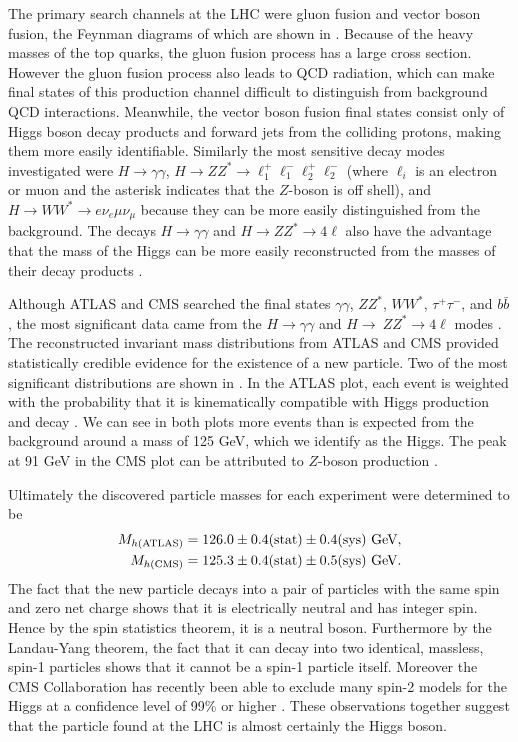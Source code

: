 The primary search channels at the LHC were gluon fusion and vector boson
fusion, the Feynman diagrams of which are shown in . 
Because of the 
heavy masses of the top quarks, the gluon fusion process has a large cross 
section. However the gluon fusion process also leads to QCD radiation, which 
can make final states of this production channel difficult to distinguish from 
background QCD interactions. Meanwhile, the vector boson fusion final states 
consist only of Higgs boson decay products and forward jets from the colliding 
protons, making them more easily identifiable. Similarly the most
sensitive decay modes investigated were $H\to\gamma\gamma$, $H\to ZZ^{*}\to
\ell_{1}^{+}\ell_{1}^{-}\ell_{2}^{+}\ell_{2}^{-}$ (where $\ell_i$ is an 
electron or muon and the asterisk indicates that the $Z$-boson is off 
shell), and
$H\to WW^{*}\to e\nu_{e}\mu\nu_{\mu}$ because they can be more easily
distinguished from the background. The decays $H\to\gamma\gamma$ 
and $H\to ZZ^{*}\to4\ell$ also have the advantage that the mass of the Higgs 
can be more easily reconstructed from the masses of their decay products
\cite{dittmaier_higgs_2013}.

Although ATLAS and CMS searched the final states $\gamma\gamma$, $ZZ^{*}$,
$WW^{*}$, $\tau^{+}\tau^{-}$, and $b\bar{b}$, the most significant data came
from the $H\to \gamma\gamma$ and $H\to\ ZZ^{*}\to4\ell$ modes \cite{thomson_modern_2013}.
The reconstructed invariant mass distributions from ATLAS and CMS provided
statistically credible evidence for the existence of a new particle. Two
of the most significant distributions are shown in 
. In the ATLAS plot,
each event is weighted with the probability that it is kinematically compatible
with Higgs production and decay \cite{thomson_modern_2013}. We can see in both plots more events
than is expected from the background around a mass of 125 GeV, which we
identify as the Higgs. The peak at 91 GeV in the CMS plot can be attributed
to $Z$-boson production \cite{thomson_modern_2013}. 

Ultimately the discovered particle masses for each experiment were determined 
\cite{dittmaier_higgs_2013} to be
\begin{equation}
  \begin{aligned}
  M_{h({\rm ATLAS})}&=126.0\pm0.4(\text{stat})
                \pm0.4(\text{sys})\ \text{GeV}, \\
  M_{h({\rm CMS})}&=125.3\pm0.4(\text{stat})\pm0.5(\text{sys})\ \text{GeV}.
  \end{aligned}
\end{equation}
The fact that the new particle decays into a pair of particles with the same
spin and zero net charge shows that it is electrically neutral and has
integer spin. Hence by the spin statistics theorem, it is a neutral boson.
Furthermore by the Landau-Yang theorem, the fact that it can decay into two 
identical, massless, spin-1 particles shows that it cannot be a spin-1 particle
itself. Moreover the CMS Collaboration has recently been able to exclude many
spin-2 models for the Higgs at a confidence level of 99\% or higher 
\cite{khachatryan_constraints_2015}.
These observations together suggest that the particle found at the LHC is 
almost certainly the Higgs boson.


